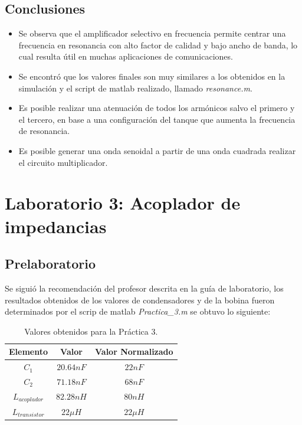 \documentclass[11pt,graphicx,caption,rotating]{article}
\begin{document}
\subsection{Conclusiones}
\begin{itemize}
 \item Se observa que el amplificador selectivo en frecuencia permite centrar una frecuencia en resonancia con alto factor de calidad y bajo ancho de banda, lo cual resulta útil en muchas aplicaciones de comunicaciones.
 \item Se encontró que los valores finales son muy similares a los obtenidos en la simulación y el script de matlab realizado, llamado \textit{resonance.m}.
 \item Es posible realizar una atenuación de todos los armónicos salvo el primero y el tercero, en base a una configuración del tanque que aumenta la frecuencia de resonancia.
 \item Es posible generar una onda senoidal a partir de una onda cuadrada realizar el circuito multiplicador.
\end{itemize}

\section{Laboratorio 3: Acoplador de impedancias}
\subsection{Prelaboratorio}
\noindent
Se siguió la recomendación del profesor descrita en la guía de laboratorio, los resultados obtenidos de los valores de condensadores y de la bobina fueron determinados por el scrip de matlab \textit{Practica\_3.m} se obtuvo lo siguiente:
\begin{table}[H]
	\centering
\begin{tabular}{|c|c|c|}\hline
 \textbf{Elemento} & \textbf{Valor} & \textbf{Valor Normalizado} \\ \hline
 $C_1$ & $20.64nF$ & $22nF$ \\ \hline
 $C_2$ & $71.18nF$ & $68nF$ \\ \hline
 $L_{acoplador}$ & $82.28nH$ & $80nH$ \\ \hline
 $L_{transistor}$ & $22 \mu H$ & $22 \mu H$ \\ \hline
    \end{tabular}
	\caption{Valores obtenidos para la Práctica $3$.}
	\label{tab4}
\end{table}
\end{document}
